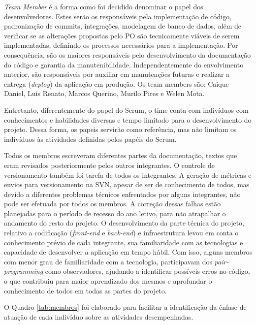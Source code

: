 \documentclass[
    12pt,               %
    openright,          %
    oneside,
    a4paper,            %
    BIBLATEX,           %
    TODO,               %
    english,            %
    brazil              %
    ]{ifsp-spo-inf-ctds}
\begin{document}
            \emph{Team Member} é a forma como foi decidido denominar o papel dos desenvolvedores. Estes serão os responsáveis pela implementação de código, padronização de commits, integrações, modelagem de banco de dados, além de verificar se as alterações propostas pelo PO são tecnicamente viáveis de serem implementadas, definindo os processos necessários para a implementação. Por consequência, são os maiores responsáveis pelo desenvolvimento da documentação do código e garantia da manutenibilidade. Independentemente do envolvimento anterior, são responsáveis por auxiliar em  manutenções futuras e realizar a entrega (\emph{deploy}) da aplicação em produção. Os team members são: Caique Daniel, Luis Renato, Marcos Querino, Murilo Pires e Welen Mota.

            Entretanto, diferentemente do papel do Scrum, o time conta com indivíduos com conhecimentos e habilidades diversas e tempo limitado para o desenvolvimento do projeto. Dessa forma, os papeis servirão como referência, mas não limitam os indivíduos às atividades definidas pelos papéis do Scrum.

            Todos os membros escreveram diferentes partes da documentação, textos que eram revisados posteriormente pelos outros integrantes. O controle de versionamento também foi tarefa de todos os integrantes. A geração de métricas e envios para versionamento na SVN, apesar de ser de conhecimento de todos, mas devido a diferentes problemas técnicos enfrentados por alguns integrantes, não pode ser efetuada por todos os membros. A correção dessas falhas estão planejadas para o período de recesso do ano letivo, para não atrapalhar o andamento do resto do projeto. O desenvolvimento da parte técnica do projeto, relativo a codificação (\emph{front-end} e \emph{back-end}) e infraestrutura levou em conta o conhecimento prévio de cada integrante, sua familiaridade com as tecnologias e capacidade de desenvolver a aplicação em tempo hábil. Com isso, alguns membros com menor grau de familiaridade com a tecnologia, participavam dos \emph{pair-programming} como observadores, ajudando a identificar possíveis erros no código, o que contribuiu para maior aprendizado dos mesmos e aprofundar o conhecimento de todos em todas as partes do projeto.

             O Quadro \ref{tab:membros} foi elaborado para facilitar a identificação da ênfase de atuação de cada indivíduo sobre as atividades desempenhadas.
\end{document}
